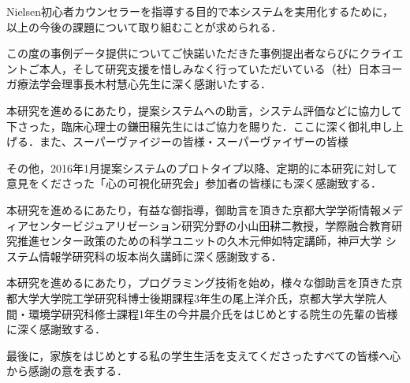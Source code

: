 \documentclass[shuuron]{kuee}
\begin{document}
Nielsen初心者カウンセラーを指導する目的で本システムを実用化するために，以上の今後の課題について取り組むことが求められる．%



\begin{acknowledgements}
  この度の事例データ提供についてご快諾いただきた事例提出者ならびにクライエントご本人，そして研究支援を惜しみなく行っていただいている（社）日本ヨーガ療法学会理事長木村慧心先生に深く感謝いたする．

本研究を進めるにあたり，提案システムへの助言，システム評価などに協力して下さった，臨床心理士の鎌田穣先生にはご協力を賜りた．ここに深く御礼申し上げる．また、スーパーヴァイジーの皆様・スーパーヴァイザーの皆様

その他，2016年1月提案システムのプロトタイプ以降、定期的に本研究に対して意見をくださった「心の可視化研究会」参加者の皆様にも深く感謝致する．

本研究を進めるにあたり，有益な御指導，御助言を頂きた京都大学学術情報メディアセンタービジュアリゼーション研究分野の小山田耕二教授，学際融合教育研究推進センター政策のための科学ユニットの久木元伸如特定講師，神戸大学 システム情報学研究科の坂本尚久講師に深く感謝致する．



本研究を進めるにあたり，プログラミング技術を始め，様々な御助言を頂きた京都大学大学院工学研究科博士後期課程3年生の尾上洋介氏，京都大学大学院人間・環境学研究科修士課程1年生の今井晨介氏をはじめとする院生の先輩の皆様に深く感謝致する．

最後に，家族をはじめとする私の学生生活を支えてくださったすべての皆様へ心から感謝の意を表する．
\end{acknowledgements}





\end{document}
